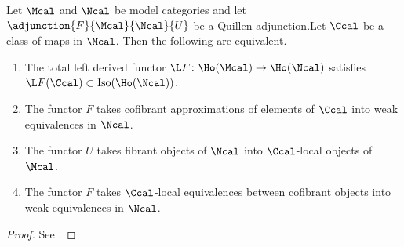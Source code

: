         \begin{thm}
            \label{thm:C_local_stuff}
            Let $\Mcal$ and $\Ncal$ be model categories and let $\adjunction{F}{\Mcal}{\Ncal}{U}$ be a Quillen adjunction.Let $\Ccal$ be a class of maps in $\Mcal$. Then the following are equivalent.
            \begin{enumerate}[label=(\alph*)]
                \item The total left derived functor $\L F\colon \Ho(\Mcal) \to \Ho(\Ncal)$ satisfies $\L F(\Ccal) \subset \mathrm{Iso}(\Ho(\Ncal))$.
                \item The functor $F$ takes cofibrant approximations of elements of $\Ccal$ into weak equivalences in $\Ncal$.
                \item The functor $U$ takes fibrant objects of $\Ncal$ into $\Ccal$-local objects of $\Mcal$.
                \item The functor $F$ takes $\Ccal$-local equivalences between cofibrant objects into weak equivalences in $\Ncal$.
            \end{enumerate}
        \end{thm}
        \begin{proof}
            See \cite[Theorem~3.1.6]{Hirs:loc}.
        \end{proof}

